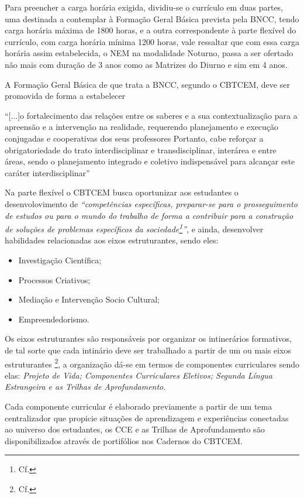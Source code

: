 Para preencher a carga horária exigida, dividiu-se o currículo em duas partes, uma destinada a contemplar à Formação Geral Básica prevista pela \ac{BNCC}, tendo carga horária máxima de 1800 horas, e a outra correspondente à parte flexível do currículo, com carga horária mínima 1200 horas, vale ressaltar que com essa carga horária assim estabelecida, o \ac{NEM} na modalidade Noturno, passa a ser ofertado não mais com duração de 3 anos como as Matrizes do Diurno e sim em 4 anos. 

A Formação Geral Básica de que trata a \ac{BNCC}, segundo o \ac{CBTCEM}, deve ser promovida de forma a estabelecer
\begin{citacao}
	``[...]o fortalecimento das relações entre os saberes e a sua contextualização para 	a apreensão e a intervenção na realidade, requerendo planejamento e execução conjugadas e cooperativas dos seus professores Portanto, cabe reforçar a obrigatoriedade do trato interdisciplinar e transdisciplinar, interárea e entre áreas, sendo o planejamento integrado e  coletivo indispensável para alcançar este caráter interdisciplinar'' \cite[pp.~58]{CADORI:2022}
\end{citacao}

Na parte flexível o \ac{CBTCEM} busca oportunizar aos estudantes o desenvolovimento de \textit{``competências específicas, preparar-se para o prosseguimento de estudos ou para o mundo do trabalho de forma a contribuir para a construção de soluções de problemas específicos da sociedade\footnote{Cf. }''}, e ainda, desenvolver habilidades relacionadas aos eixos estruturantes, sendo eles:
\begin{itemize}
		\item Investigação Científica;
		\item Processos Criativos;
		\item Mediação e Intervenção Socio Cultural;
		\item Empreendedorismo.
\end{itemize}
Os eixos estruturantes são responsáveis por organizar os intinerários formativos, de tal sorte que cada intinário deve ser trabalhado a partir de um ou mais eixos estruturantes \footnote{Cf. }, a organização dá-se em termos de componentes curriculares sendo elas: \textit{Projeto de Vida; Componentes Curriculares Eletivos; Segunda Língua Estrangeira e as Trilhas de Aprofundamento}.

Cada componente curricular é elaborado previamente a partir de um tema centralizador que propicie situações de aprendizagem e experiências conectadas ao universo dos estudantes, os \ac{CCE} e as Trilhas de Aprofundamento são disponibilizados através de portifólios nos Cadernos do \ac{CBTCEM}.

